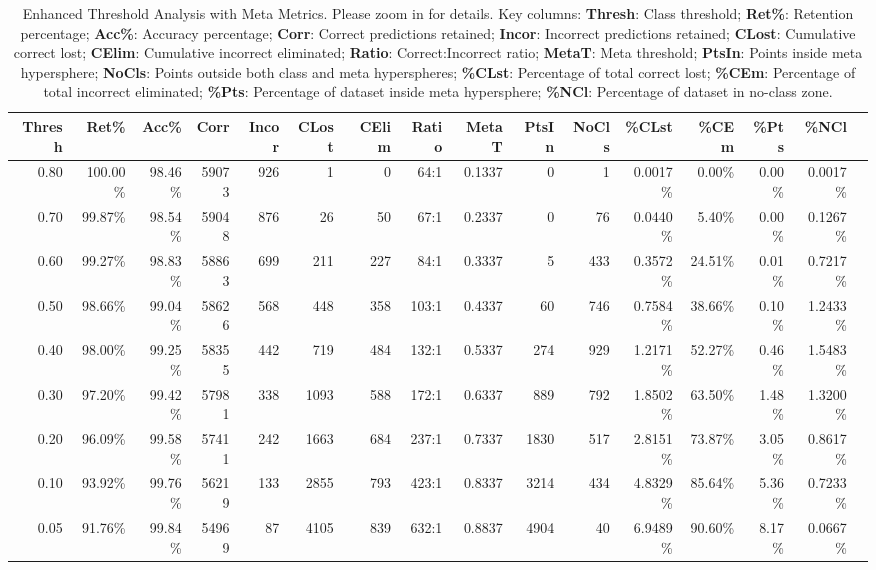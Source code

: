 \begin{table}[ht]
\centering
\tiny
\caption{Enhanced Threshold Analysis with Meta Metrics. 
Please zoom in for details. Key columns:
\textbf{Thresh}: Class threshold;
\textbf{Ret\%}: Retention percentage;
\textbf{Acc\%}: Accuracy percentage;
\textbf{Corr}: Correct predictions retained;
\textbf{Incor}: Incorrect predictions retained;
\textbf{CLost}: Cumulative correct lost;
\textbf{CElim}: Cumulative incorrect eliminated;
\textbf{Ratio}: Correct:Incorrect ratio;
\textbf{MetaT}: Meta threshold;
\textbf{PtsIn}: Points inside meta hypersphere;
\textbf{NoCls}: Points outside both class and meta hyperspheres;
\textbf{\%CLst}: Percentage of total correct lost;
\textbf{\%CEm}: Percentage of total incorrect eliminated;
\textbf{\%Pts}: Percentage of dataset inside meta hypersphere;
\textbf{\%NCl}: Percentage of dataset in no-class zone.}
\label{tab:threshold_analysis}
\begin{tabular}{r r r r r r r r r r r r r r r r}
\toprule
Thresh & Ret\% & Acc\% & Corr & Incor & CLost & CElim & Ratio & MetaT & PtsIn & NoCls & \%CLst & \%CEm & \%Pts & \%NCl \\
\midrule
0.80 & 100.00\% & 98.46\% & 59073 & 926 & 1 & 0 & 64:1 & 0.1337 & 0 & 1 & 0.0017\% & 0.00\% & 0.00\% & 0.0017\% \\
0.70 & 99.87\% & 98.54\% & 59048 & 876 & 26 & 50 & 67:1 & 0.2337 & 0 & 76 & 0.0440\% & 5.40\% & 0.00\% & 0.1267\% \\
0.60 & 99.27\% & 98.83\% & 58863 & 699 & 211 & 227 & 84:1 & 0.3337 & 5 & 433 & 0.3572\% & 24.51\% & 0.01\% & 0.7217\% \\
0.50 & 98.66\% & 99.04\% & 58626 & 568 & 448 & 358 & 103:1 & 0.4337 & 60 & 746 & 0.7584\% & 38.66\% & 0.10\% & 1.2433\% \\
0.40 & 98.00\% & 99.25\% & 58355 & 442 & 719 & 484 & 132:1 & 0.5337 & 274 & 929 & 1.2171\% & 52.27\% & 0.46\% & 1.5483\% \\
0.30 & 97.20\% & 99.42\% & 57981 & 338 & 1093 & 588 & 172:1 & 0.6337 & 889 & 792 & 1.8502\% & 63.50\% & 1.48\% & 1.3200\% \\
0.20 & 96.09\% & 99.58\% & 57411 & 242 & 1663 & 684 & 237:1 & 0.7337 & 1830 & 517 & 2.8151\% & 73.87\% & 3.05\% & 0.8617\% \\
0.10 & 93.92\% & 99.76\% & 56219 & 133 & 2855 & 793 & 423:1 & 0.8337 & 3214 & 434 & 4.8329\% & 85.64\% & 5.36\% & 0.7233\% \\
0.05 & 91.76\% & 99.84\% & 54969 & 87 & 4105 & 839 & 632:1 & 0.8837 & 4904 & 40 & 6.9489\% & 90.60\% & 8.17\% & 0.0667\% \\
\bottomrule
\end{tabular}
\label{app:enhanced_threshold_analysis}
\end{table}

